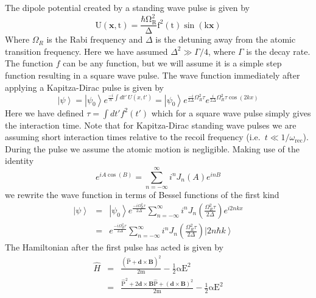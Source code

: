 \documentclass[twocolumn,english,pra,aps,superscriptaddress,floatfix]{revtex4-1}
\begin{document}
The dipole potential created by a standing wave pulse is given by
\begin{equation}
\mathrm{U(\mathbf{x},t)=\frac{\hbar \Omega_R^2}{\Delta}f^2(t)\sin{(k\mathbf{x})}}
\end{equation}
Where $\Omega_R$ is the Rabi frequency and $\Delta$ is the detuning away from the atomic transition frequency.  Here we have assumed $\Delta^2 \gg \Gamma/4$, where $\Gamma$ is the decay rate. The function $f$ can be any function, but we will assume it is a simple step function resulting in a square wave pulse.
The wave function immediately after applying a Kapitza-Dirac pulse is given by \cite{meystre,ketterle}
\begin{equation}
\left|\psi\right>=\left|\psi_0\right>e^{\frac{-i}{\hbar}\int dt'\,U(x,t')}=\left|\psi_0\right>e^{\frac{-i}{2\Delta}\Omega_R^2\tau}e^{\frac{i}{2\Delta}\Omega_R^2\tau\cos{(2kx)}}
\end{equation}
Here we have defined $\tau=\int dt' f^2(t')$ which for a square wave pulse simply gives the interaction time.  Note that for Kapitza-Dirac standing wave pulses we are assuming short interaction times relative to the recoil frequency (i.e.\, $t\ll 1/\omega_{\mathrm{rec}}$).  During the pulse we assume the atomic motion is negligible.   Making use of the identity 
\begin{equation}
e^{iA\cos{(B)}}=\sum\limits_{n=-\infty}^{\infty}i^nJ_n(A)e^{inB}
\end{equation}
we rewrite the wave function in terms of Bessel functions of the first kind
\begin{eqnarray}
\left|\psi\right>&=&\left|\psi_0\right>e^{\frac{-i\Omega_R^2\tau}{2\Delta}}\sum\limits_{n=-\infty}^{\infty}i^nJ_n\left(\frac{\Omega_R^2\tau}{2\Delta}\right)e^{i2nkx} \nonumber \\
&=&e^{\frac{-i\Omega_R^2\tau}{2\Delta}}\sum\limits_{n=-\infty}^{\infty}i^nJ_n\left(\frac{\Omega_R^2\tau}{2\Delta}\right)\left|2n\hbar k\right>
\end{eqnarray}
The Hamiltonian after the first pulse has acted is given by
\begin{eqnarray}
\hat{H}&=&\mathrm{\frac{\left(\hat{P}+\mathbf{d}\times\mathbf{B}\right)^2}{2m}-\frac{1}{2}\alpha E^2}\nonumber \\
&=&\mathrm{\frac{\hat{P}^2+2\mathbf{d}\times\mathbf{B}\hat{P}+\left(\mathbf{d}\times\mathbf{B}\right)^2}{2m}-\frac{1}{2}\alpha E^2}\nonumber \\
\end{eqnarray}
\end{document}
